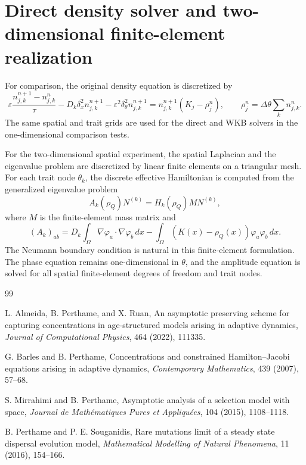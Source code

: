 \documentclass[11pt]{article}
\begin{document}
\section{Direct density solver and two-dimensional finite-element realization}\label{app:direct_2d}

For comparison, the original density equation is discretized by
\begin{equation}\label{eq:direct_density_fully_new}
    \varepsilon\frac{n_{j,k}^{n+1}-n_{j,k}^n}{\tau}
    -D_k\delta_x^2n_{j,k}^{n+1}
    -\varepsilon^2\delta_\theta^2n_{j,k}^{n+1}
    =n_{j,k}^{n+1}(K_j-\rho_j^n),
    \qquad
    \rho_j^n=\Delta\theta\sum_k n_{j,k}^n.
\end{equation}
The same spatial and trait grids are used for the direct and WKB solvers in the one-dimensional comparison tests.

For the two-dimensional spatial experiment, the spatial Laplacian and the eigenvalue problem are discretized by linear finite elements on a triangular mesh.  For each trait node \(\theta_k\), the discrete effective Hamiltonian is computed from the generalized eigenvalue problem
\begin{equation}\label{eq:fem_H_new}
    A_k(\rho_Q)N^{(k)}=H_k(\rho_Q)M N^{(k)},
\end{equation}
where \(M\) is the finite-element mass matrix and
\begin{equation}\label{eq:fem_A_new}
    (A_k)_{ab}
    =D_k\int_\Omega \nabla\varphi_a\cdot\nabla\varphi_b\,dx
    -\int_\Omega (K(x)-\rho_Q(x))\varphi_a\varphi_b\,dx.
\end{equation}
The Neumann boundary condition is natural in this finite-element formulation.  The phase equation remains one-dimensional in \(\theta\), and the amplitude equation is solved for all spatial finite-element degrees of freedom and trait nodes.


\begin{thebibliography}{99}

L. Almeida, B. Perthame, and X. Ruan,
An asymptotic preserving scheme for capturing concentrations in
age-structured models arising in adaptive dynamics,
\emph{Journal of Computational Physics}, 464 (2022), 111335.

G. Barles and B. Perthame,
Concentrations and constrained Hamilton--Jacobi equations arising in adaptive
dynamics,
\emph{Contemporary Mathematics}, 439 (2007), 57--68.

S. Mirrahimi and B. Perthame,
Asymptotic analysis of a selection model with space,
\emph{Journal de Math\'{e}matiques Pures et Appliqu\'{e}es}, 104 (2015),
1108--1118.

B. Perthame and P. E. Souganidis,
Rare mutations limit of a steady state dispersal evolution model,
\emph{Mathematical Modelling of Natural Phenomena}, 11 (2016), 154--166.

\end{thebibliography}
\end{document}
